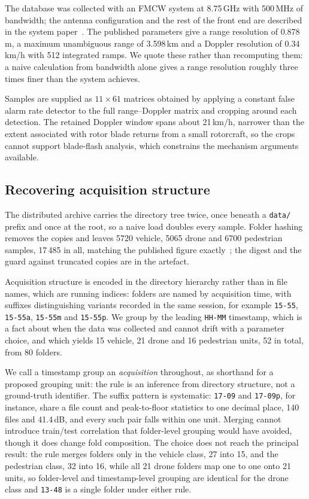 \documentclass[conference]{IEEEtran}
\begin{document}
The database was collected with an FMCW system at 8.75\,GHz with 500\,MHz of bandwidth; the antenna configuration and the rest of the front end are described in the system paper~\cite{quevedo2019}. The published parameters give a range resolution of 0.878\,m, a maximum unambiguous range of 3.598\,km and a Doppler resolution of 0.34\,km/h with 512 integrated ramps. We quote these rather than recomputing them: a naive calculation from bandwidth alone gives a range resolution roughly three times finer than the system achieves.

Samples are supplied as $11 \times 61$ matrices obtained by applying a constant false alarm rate detector to the full range--Doppler matrix and cropping around each detection. The retained Doppler window spans about 21\,km/h, narrower than the extent associated with rotor blade returns from a small rotorcraft, so the crops cannot support blade-flash analysis, which constrains the mechanism arguments available.

\subsection{Recovering acquisition structure}

The distributed archive carries the directory tree twice, once beneath a \texttt{data/} prefix and once at the root, so a naive load doubles every sample. Folder hashing removes the copies and leaves 5720 vehicle, 5065 drone and 6700 pedestrian samples, 17\,485 in all, matching the published figure exactly~\cite{zhang2025}; the digest and the guard against truncated copies are in the artefact.

Acquisition structure is encoded in the directory hierarchy rather than in file names, which are running indices: folders are named by acquisition time, with suffixes distinguishing variants recorded in the same session, for example \texttt{15-55}, \texttt{15-55a}, \texttt{15-55m} and \texttt{15-55p}. We group by the leading \texttt{HH-MM} timestamp, which is a fact about when the data was collected and cannot drift with a parameter choice, and which yields 15 vehicle, 21 drone and 16 pedestrian units, 52 in total, from 80 folders.

We call a timestamp group an \emph{acquisition} throughout, as shorthand for a proposed grouping unit: the rule is an inference from directory structure, not a ground-truth identifier. The suffix pattern is systematic: \texttt{17-09} and \texttt{17-09p}, for instance, share a file count and peak-to-floor statistics to one decimal place, 140 files and 41.4\,dB, and every such pair falls within one unit. Merging cannot introduce train/test correlation that folder-level grouping would have avoided, though it does change fold composition. The choice does not reach the principal result: the rule merges folders only in the vehicle class, 27 into 15, and the pedestrian class, 32 into 16, while all 21 drone folders map one to one onto 21 units, so folder-level and timestamp-level grouping are identical for the drone class and \texttt{13-48} is a single folder under either rule.
\end{document}
